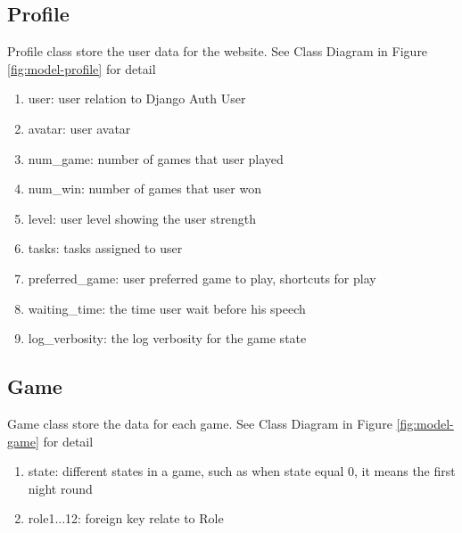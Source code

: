 \documentclass[11pt]{article}
\begin{document}
\subsection{Profile}
Profile class store the user data for the website. See Class Diagram in Figure \ref{fig:model-profile} for detail
\begin{enumerate}
\item
user: user relation to Django Auth User
\item
avatar: user avatar
\item
num\_game: number of games that user played
\item
num\_win: number of games that user won
\item
level: user level showing the user strength
\item
tasks: tasks assigned to user
\item
preferred\_game: user preferred game to play, shortcuts for play
\item
waiting\_time: the time user wait before his speech
\item
log\_verbosity: the log verbosity for the game state
\end{enumerate}

\subsection{Game}
Game class store the data for each game. See Class Diagram in Figure \ref{fig:model-game} for detail
\begin{enumerate}
\item
state: different states in a game, such as when state equal 0, it means the first night round
\item
role1...12: foreign key relate to Role
\end{enumerate}
\end{document}

